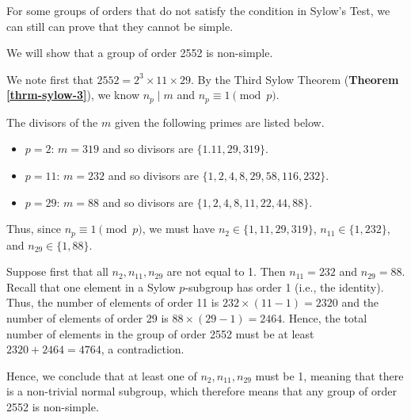For some groups of orders that do not satisfy the condition in Sylow's Test, we can still can prove that they cannot be simple.

\newpage

\begin{example}
    We will show that a group of order 2552 is non-simple.

    We note first that $2552 = 2^3 \times 11 \times 29$. By the Third Sylow Theorem (\textbf{Theorem \ref{thrm-sylow-3}}), we know $n_p \mid m$ and $n_p \equiv 1 \pmod p$.

    The divisors of the $m$ given the following primes are listed below.
    \begin{itemize}
        \item $p = 2$: $m = 319$ and so divisors are $\{1. 11, 29, 319\}$.
        \item $p = 11$: $m = 232$ and so divisors are $\{1, 2, 4, 8, 29, 58, 116, 232\}$.
        \item $p = 29$: $m = 88$ and so divisors are $\{1, 2, 4, 8, 11, 22, 44, 88\}$.
    \end{itemize}
    Thus, since $n_p \equiv 1 \pmod p$, we must have $n_2 \in \{1, 11, 29, 319\}$, $n_{11} \in \{1, 232\}$, and $n_{29} \in \{1, 88\}$.

    Suppose first that all $n_2, n_{11}, n_{29}$ are not equal to 1. Then $n_{11} = 232$ and $n_{29} = 88$. Recall that one element in a Sylow $p$-subgroup has order 1 (i.e., the identity). Thus, the number of elements of order 11 is $232 \times (11 - 1) = 2320$ and the number of elements of order 29 is $88 \times (29 - 1) = 2464$. Hence, the total number of elements in the group of order 2552 must be at least $2320 + 2464 = 4764$, a contradiction.

    Hence, we conclude that at least one of $n_2, n_{11}, n_{29}$ must be 1, meaning that there is a non-trivial normal subgroup, which therefore means that any group of order 2552 is non-simple.
\end{example}

